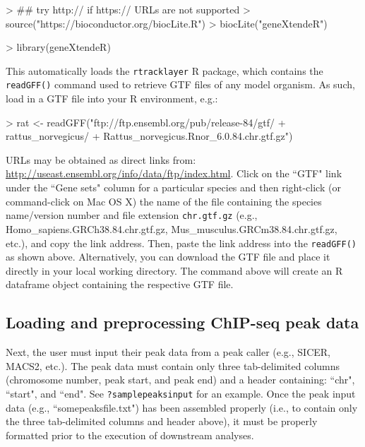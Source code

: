 \documentclass[12pt]{article}
\begin{document}
\begin{Schunk}
\begin{Sinput}
> ## try http:// if https:// URLs are not supported
> source("https://bioconductor.org/biocLite.R")
> biocLite("geneXtendeR")
\end{Sinput}
\end{Schunk}

\begin{Schunk}
\begin{Sinput}
> library(geneXtendeR)
\end{Sinput}
\end{Schunk}

This automatically loads the \texttt{rtracklayer} R package, which contains the \texttt{readGFF()} command used to retrieve GTF files of any model organism.  As such, load in a GTF file into your R environment, e.g.:

\begin{Schunk}
\begin{Sinput}
> rat <- readGFF("ftp://ftp.ensembl.org/pub/release-84/gtf/
+                       rattus_norvegicus/
+                       Rattus_norvegicus.Rnor_6.0.84.chr.gtf.gz")
\end{Sinput}
\end{Schunk}

URLs may be obtained as direct links from: \url{http://useast.ensembl.org/info/data/ftp/index.html}.  Click on the ``GTF" link under the ``Gene sets" column for a particular species and then right-click (or command-click on Mac OS X) the name of the file containing the species name/version number and file extension \texttt{chr.gtf.gz} (e.g., Homo\_sapiens.GRCh38.84.chr.gtf.gz, Mus\_musculus.GRCm38.84.chr.gtf.gz, etc.), and copy the link address.  Then, paste the link address into the \texttt{readGFF()} as shown above.  Alternatively, you can download the GTF file and place it directly in your local working directory.  The command above will create an R dataframe object containing the respective GTF file.

\subsection{Loading and preprocessing ChIP-seq peak data}

Next, the user must input their peak data from a peak caller (e.g., SICER, MACS2, etc.).  The peak data must contain only three tab-delimited columns (chromosome number, peak start, and peak end) and a header containing: ``chr", ``start", and ``end".  See \texttt{?samplepeaksinput} for an example.  Once the peak input data (e.g., ``somepeaksfile.txt") has been assembled properly (i.e., to contain only the three tab-delimited columns and header above), it must be properly formatted prior to the execution of downstream analyses.  
\end{document}
